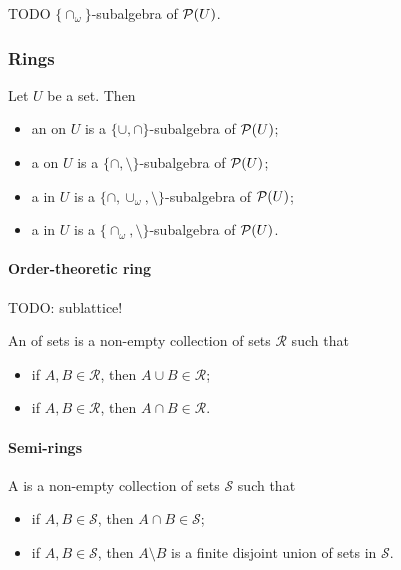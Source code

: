 TODO $\{\cap_{\omega}\}$-subalgebra of $\operatorname{\mathcal{P}}(U)$.

\subsubsection{Rings}
\begin{definition}
Let $U$ be a set. Then
\begin{itemize}
\item an  on $U$ is a $\{\cup,\cap\}$-subalgebra of $\operatorname{\mathcal{P}}(U)$;
\item a  on $U$ is a $\{\cap,\setminus\}$-subalgebra of $\operatorname{\mathcal{P}}(U)$;
\item a  in $U$ is a $\{\cap, \cup_\omega,\setminus\}$-subalgebra of $\operatorname{\mathcal{P}}(U)$;
\item a  in $U$ is a $\{\cap_\omega,\setminus\}$-subalgebra of $\operatorname{\mathcal{P}}(U)$.
\end{itemize}
\end{definition}

\paragraph{Order-theoretic ring}
TODO: sublattice!
\begin{definition}
An  of sets is a non-empty collection of sets $\mathcal{R}$ such that
\begin{itemize}
\item if $A,B\in \mathcal{R}$, then $A\cup B\in \mathcal{R}$;
\item if $A,B\in \mathcal{R}$, then $A\cap B\in \mathcal{R}$.
\end{itemize}
\end{definition}

\paragraph{Semi-rings}
\begin{definition}
A  is a non-empty collection of sets $\mathcal{S}$ such that
\begin{itemize}
\item if $A,B\in \mathcal{S}$, then $A\cap B\in \mathcal{S}$;
\item if $A,B\in \mathcal{S}$, then $A\setminus B$ is a finite disjoint union of sets in $\mathcal{S}$.
\end{itemize}
\end{definition}

